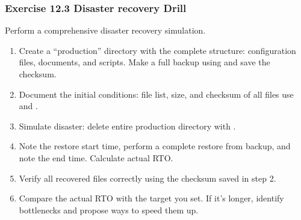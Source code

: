 \subsubsection*{Exercise 12.3 Disaster recovery Drill}
Perform a comprehensive disaster recovery simulation.
\begin{enumerate}
\item Create a ``production'' directory with the complete structure: configuration files,
documents, and scripts. Make a full backup using  and save the checksum.
\item Document the initial conditions: file list, size, and checksum of all
files use  and .
\item Simulate disaster: delete entire production directory with .
\item Note the restore start time, perform a complete restore from backup, and
note the end time. Calculate actual RTO.
\item Verify all recovered files correctly using the checksum
saved in step 2.
\item Compare the actual RTO with the target you set. If it's longer,
identify bottlenecks and propose ways to speed them up.
\end{enumerate}

